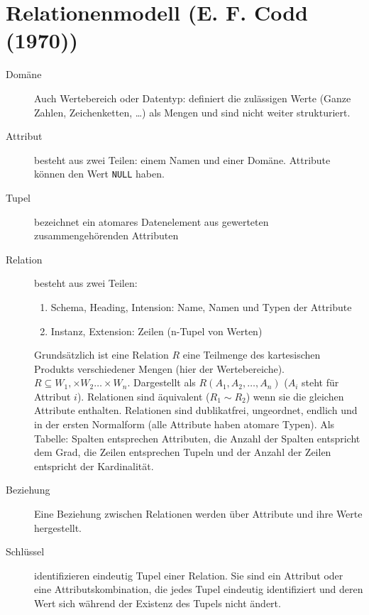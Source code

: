 \section{Relationenmodell (E. F. Codd (1970))}

\begin{description}
	\item [Domäne] Auch Wertebereich oder Datentyp: definiert die zulässigen Werte (Ganze Zahlen, Zeichenketten, \dots)
	als Mengen und sind nicht weiter strukturiert.
	\item [Attribut] besteht aus zwei Teilen: einem Namen und einer Domäne. Attribute können den Wert \texttt{NULL} haben.
	\item [Tupel] bezeichnet ein atomares Datenelement aus gewerteten zusammengehörenden Attributen
	\item [Relation] besteht aus zwei Teilen:
	\begin{enumerate}
		\item Schema, Heading, Intension: Name, Namen und Typen der Attribute
		\item Instanz, Extension: Zeilen (n-Tupel von Werten)
	\end{enumerate}
	Grundsätzlich ist eine Relation $R$ eine Teilmenge des kartesischen Produkts verschiedener Mengen (hier der Wertebereiche).
	$R \subseteq W_1, \times W_2 \dots \times W_n$. Dargestellt als $R(A_1, A_2, \dots, A_n)$ ($A_i$ steht für Attribut $i$).
	Relationen sind äquivalent ($R_1 \sim R_2$) wenn sie die gleichen Attribute enthalten. Relationen sind dublikatfrei, ungeordnet, 
	endlich und in der ersten Normalform (alle Attribute haben atomare Typen). Als Tabelle: Spalten entsprechen Attributen, die Anzahl der Spalten entspricht dem Grad,
	die Zeilen entsprechen Tupeln und der Anzahl der Zeilen entspricht der Kardinalität.
	\item [Beziehung] Eine Beziehung zwischen Relationen werden über Attribute und ihre Werte hergestellt.
	\item [Schlüssel] identifizieren eindeutig Tupel einer Relation. Sie sind ein Attribut oder eine Attributskombination,
	die jedes Tupel eindeutig identifiziert und deren Wert sich während der Existenz des Tupels nicht ändert.
\end{description}



